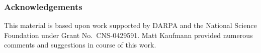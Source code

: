 \documentclass[conference]{IEEEtran}
\begin{document}
\vspace*{2mm}

\subsubsection*{Acknowledgements}
This material is based upon work supported by DARPA and the National
Science Foundation under Grant No.~CNS-0429591. Matt Kaufmann provided
numerous comments and suggestions in course of this work.

 

\end{document}
